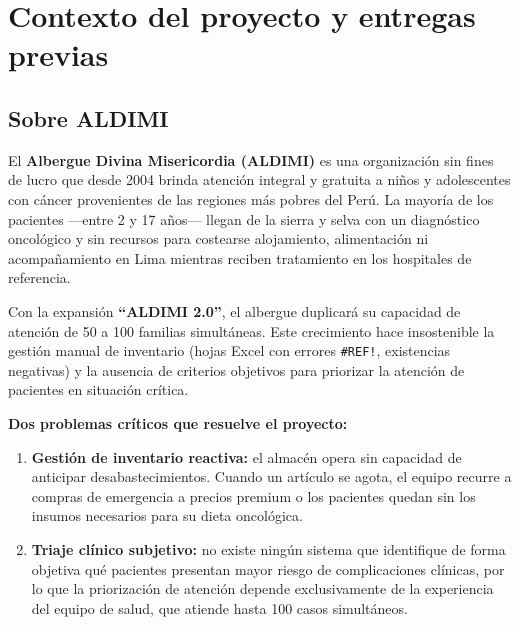 \documentclass[12pt, a4paper]{article}
\begin{document}
\setcounter{page}{1}
\tableofcontents
\newpage

\section{Contexto del proyecto y entregas previas}

\subsection{Sobre ALDIMI}

El \textbf{Albergue Divina Misericordia (ALDIMI)} es una organizaci\'on sin fines de lucro que desde 2004 brinda atenci\'on integral y gratuita a ni\~nos y adolescentes con c\'ancer provenientes de las regiones m\'as pobres del Per\'u. La mayor\'ia de los pacientes ---entre 2 y 17 a\~nos--- llegan de la sierra y selva con un diagn\'ostico oncol\'ogico y sin recursos para costearse alojamiento, alimentaci\'on ni acompa\~namiento en Lima mientras reciben tratamiento en los hospitales de referencia.

Con la expansi\'on \textbf{``ALDIMI 2.0''}, el albergue duplicar\'a su capacidad de atenci\'on de 50 a 100 familias simult\'aneas. Este crecimiento hace insostenible la gesti\'on manual de inventario (hojas Excel con errores \texttt{\#REF!}, existencias negativas) y la ausencia de criterios objetivos para priorizar la atenci\'on de pacientes en situaci\'on cr\'itica.

\begin{infobox}
\textbf{Dos problemas cr\'iticos que resuelve el proyecto:}
\begin{enumerate}[leftmargin=1.8em, itemsep=4pt]
  \item \textbf{Gesti\'on de inventario reactiva:} el almac\'en opera sin capacidad de anticipar desabastecimientos. Cuando un art\'iculo se agota, el equipo recurre a compras de emergencia a precios premium o los pacientes quedan sin los insumos necesarios para su dieta oncol\'ogica.
  \item \textbf{Triaje cl\'inico subjetivo:} no existe ning\'un sistema que identifique de forma objetiva qu\'e pacientes presentan mayor riesgo de complicaciones cl\'inicas, por lo que la priorizaci\'on de atenci\'on depende exclusivamente de la experiencia del equipo de salud, que atiende hasta 100 casos simult\'aneos.
\end{enumerate}
\end{infobox}
\end{document}
